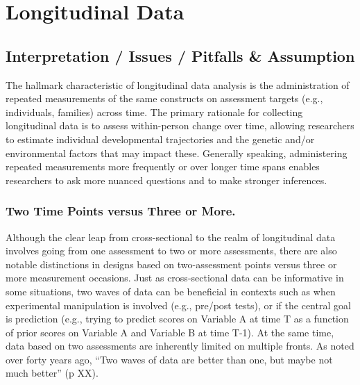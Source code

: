 \documentclass[
  number,
  preprint,
  3p,
  twocolumn]{elsarticle}
\begin{document}
\hypertarget{longitudinal-data}{%
\section{Longitudinal Data}\label{longitudinal-data}}

\label{sec:headings}

\hypertarget{interpretation-issues-pitfalls-assumption}{%
\subsection{Interpretation / Issues / Pitfalls \&
Assumption}\label{interpretation-issues-pitfalls-assumption}}

The hallmark characteristic of longitudinal data analysis is the
administration of repeated measurements of the same constructs on
assessment targets (e.g., individuals, families) across time. The
primary rationale for collecting longitudinal data is to assess
within-person change over time, allowing researchers to estimate
individual developmental trajectories and the genetic and/or
environmental factors that may impact these. Generally speaking,
administering repeated measurements more frequently or over longer time
spans enables researchers to ask more nuanced questions and to make
stronger inferences.

\hypertarget{two-time-points-versus-three-or-more.}{%
\subsubsection{Two Time Points versus Three or
More.}\label{two-time-points-versus-three-or-more.}}

Although the clear leap from cross-sectional to the realm of
longitudinal data involves going from one assessment to two or more
assessments, there are also notable distinctions in designs based on
two-assessment points versus three or more measurement occasions. Just
as cross-sectional data can be informative in some situations, two waves
of data can be beneficial in contexts such as when experimental
manipulation is involved (e.g., pre/post tests), or if the central goal
is prediction (e.g., trying to predict scores on Variable A at time T as
a function of prior scores on Variable A and Variable B at time T-1). At
the same time, data based on two assessments are inherently limited on
multiple fronts. As \citep{rogosa1982} noted over forty years ago, ``Two
waves of data are better than one, but maybe not much better'' (p XX).
\end{document}
